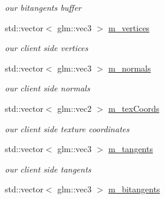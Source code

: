 \begin{DoxyCompactItemize}
\begin{DoxyCompactList}\small\item\em our bitangents buffer \end{DoxyCompactList}\item 
\hypertarget{class_opti_x_model_a4506c44afb4f00265acddb0aebd1c710}{std\-::vector$<$ glm\-::vec3 $>$ \hyperlink{class_opti_x_model_a4506c44afb4f00265acddb0aebd1c710}{m\-\_\-vertices}}\label{class_opti_x_model_a4506c44afb4f00265acddb0aebd1c710}

\begin{DoxyCompactList}\small\item\em our client side vertices \end{DoxyCompactList}\item 
\hypertarget{class_opti_x_model_a04b0f22a49f2a3f02fa93dbbce4b9c8e}{std\-::vector$<$ glm\-::vec3 $>$ \hyperlink{class_opti_x_model_a04b0f22a49f2a3f02fa93dbbce4b9c8e}{m\-\_\-normals}}\label{class_opti_x_model_a04b0f22a49f2a3f02fa93dbbce4b9c8e}

\begin{DoxyCompactList}\small\item\em our client side normals \end{DoxyCompactList}\item 
\hypertarget{class_opti_x_model_a78d4acec55affd8e13a2a924f9a0dd51}{std\-::vector$<$ glm\-::vec2 $>$ \hyperlink{class_opti_x_model_a78d4acec55affd8e13a2a924f9a0dd51}{m\-\_\-tex\-Coords}}\label{class_opti_x_model_a78d4acec55affd8e13a2a924f9a0dd51}

\begin{DoxyCompactList}\small\item\em our client side texture coordinates \end{DoxyCompactList}\item 
\hypertarget{class_opti_x_model_a9eb66c65e00f58dc9a1f9fda1fa1d009}{std\-::vector$<$ glm\-::vec3 $>$ \hyperlink{class_opti_x_model_a9eb66c65e00f58dc9a1f9fda1fa1d009}{m\-\_\-tangents}}\label{class_opti_x_model_a9eb66c65e00f58dc9a1f9fda1fa1d009}

\begin{DoxyCompactList}\small\item\em our client side tangents \end{DoxyCompactList}\item 
\hypertarget{class_opti_x_model_a86c48571467f2697d08b9e33c582203f}{std\-::vector$<$ glm\-::vec3 $>$ \hyperlink{class_opti_x_model_a86c48571467f2697d08b9e33c582203f}{m\-\_\-bitangents}}\label{class_opti_x_model_a86c48571467f2697d08b9e33c582203f}


\end{DoxyCompactItemize}
